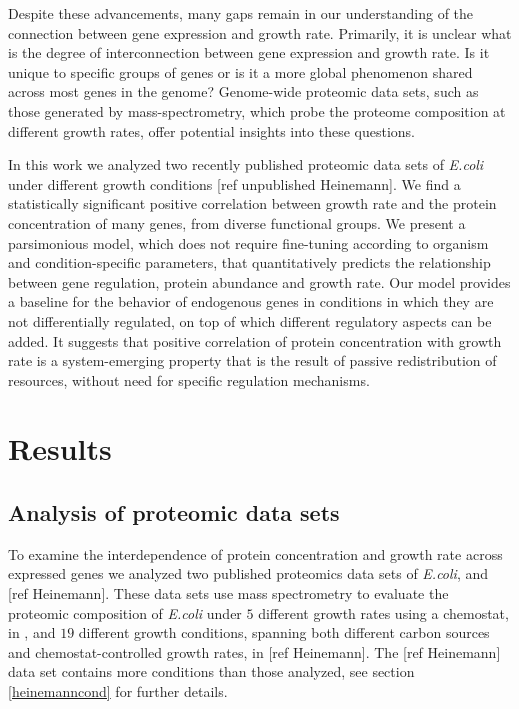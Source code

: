 \documentclass[notitlepage]{article}
\begin{document}
Despite these advancements, many gaps remain in our understanding of the connection between gene expression and growth rate.
Primarily, it is unclear what is the degree of interconnection between gene expression and growth rate.
Is it unique to specific groups of genes or is it a more global phenomenon shared across most genes in the genome?
Genome-wide proteomic data sets, such as those generated by mass-spectrometry, which probe the proteome composition at different growth rates, offer potential insights into these questions.

In this work we analyzed two recently published proteomic data sets of \emph{E.coli} under different growth conditions \parencite{Valgepea2013} [ref unpublished Heinemann].
We find a statistically significant positive correlation between growth rate and the protein concentration of many genes, from diverse functional groups.
We present a parsimonious model, which does not require fine-tuning according to organism and condition-specific parameters, that quantitatively predicts the relationship between gene regulation, protein abundance and growth rate.
Our model provides a baseline for the behavior of endogenous genes in conditions in which they are not differentially regulated, on top of which different regulatory aspects can be added.
It suggests that positive correlation of protein concentration with growth rate is a system-emerging property that is the result of passive redistribution of resources, without need for specific regulation mechanisms.

\section{Results}
\subsection{Analysis of proteomic data sets}
To examine the interdependence of protein concentration and growth rate across expressed genes we analyzed two published proteomics data sets of \emph{E.coli}, \parencite{Valgepea2013} and [ref Heinemann].
These data sets use mass spectrometry to evaluate the proteomic composition of \emph{E.coli} under $5$ different growth rates using a chemostat, in \parencite{Valgepea2013}, and $19$ different growth conditions, spanning both different carbon sources and chemostat-controlled growth rates, in [ref Heinemann].
The [ref Heinemann] data set contains more conditions than those analyzed, see section \ref{heinemanncond} for further details.
\end{document}
